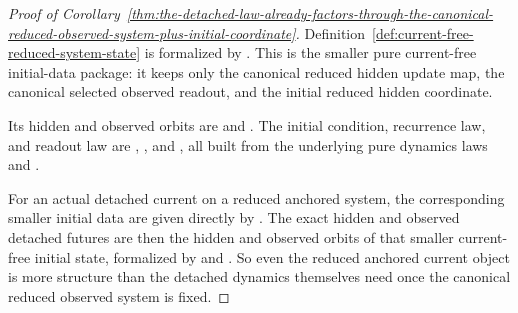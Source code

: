 \begin{proof}[Proof of Corollary~\ref{thm:the-detached-law-already-factors-through-the-canonical-reduced-observed-system-plus-initial-coordinate}]
\label{proof:thm:the-detached-law-already-factors-through-the-canonical-reduced-observed-system-plus-initial-coordinate}
Definition~\ref{def:current-free-reduced-system-state} is formalized by
. This is the smaller pure
current-free initial-data package: it keeps only the canonical reduced hidden
update map, the canonical selected observed readout, and the initial reduced
hidden coordinate.

Its hidden and observed orbits are
and
. The
initial condition, recurrence law, and readout law are
,
,
and
,
all built from the underlying pure dynamics laws
and
.

For an actual detached current on a reduced anchored system, the corresponding
smaller initial data are given directly by
. The exact
hidden and observed detached futures are then the hidden and observed orbits of
that smaller current-free initial state, formalized by
and
.
So even the reduced anchored current object is more structure than the detached
dynamics themselves need once the canonical reduced observed system is fixed.
\end{proof}

